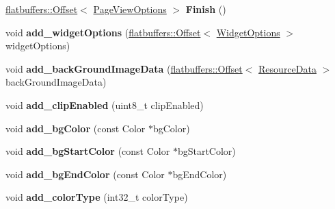 \begin{DoxyCompactItemize}
\hyperlink{structflatbuffers_1_1Offset}{flatbuffers\+::\+Offset}$<$ \hyperlink{structflatbuffers_1_1PageViewOptions}{Page\+View\+Options} $>$ {\bfseries Finish} ()
\item 
\mbox{\label{structflatbuffers_1_1PageViewOptionsBuilder_a683a42de9cd96d8879da363861563b71}} 
void {\bfseries add\+\_\+widget\+Options} (\hyperlink{structflatbuffers_1_1Offset}{flatbuffers\+::\+Offset}$<$ \hyperlink{structflatbuffers_1_1WidgetOptions}{Widget\+Options} $>$ widget\+Options)
\item 
\mbox{\label{structflatbuffers_1_1PageViewOptionsBuilder_abbd1fc8b5bf05a62dec96d3571e20d1e}} 
void {\bfseries add\+\_\+back\+Ground\+Image\+Data} (\hyperlink{structflatbuffers_1_1Offset}{flatbuffers\+::\+Offset}$<$ \hyperlink{structflatbuffers_1_1ResourceData}{Resource\+Data} $>$ back\+Ground\+Image\+Data)
\item 
\mbox{\label{structflatbuffers_1_1PageViewOptionsBuilder_a66253cc68a754128dfc57fcfe03e0b07}} 
void {\bfseries add\+\_\+clip\+Enabled} (uint8\+\_\+t clip\+Enabled)
\item 
\mbox{\label{structflatbuffers_1_1PageViewOptionsBuilder_a85fd87637742780892fc7ef06d47ad58}} 
void {\bfseries add\+\_\+bg\+Color} (const Color $\ast$bg\+Color)
\item 
\mbox{\label{structflatbuffers_1_1PageViewOptionsBuilder_a47d4882acdcd2cfd3ec68188970a4066}} 
void {\bfseries add\+\_\+bg\+Start\+Color} (const Color $\ast$bg\+Start\+Color)
\item 
\mbox{\label{structflatbuffers_1_1PageViewOptionsBuilder_a59a1440bbb31f15b0f04eb147c4778da}} 
void {\bfseries add\+\_\+bg\+End\+Color} (const Color $\ast$bg\+End\+Color)
\item 
\mbox{\label{structflatbuffers_1_1PageViewOptionsBuilder_adb7040b6315c52af185a2b7d1d8feea6}} 
void {\bfseries add\+\_\+color\+Type} (int32\+\_\+t color\+Type)
\item 

\end{DoxyCompactItemize}

